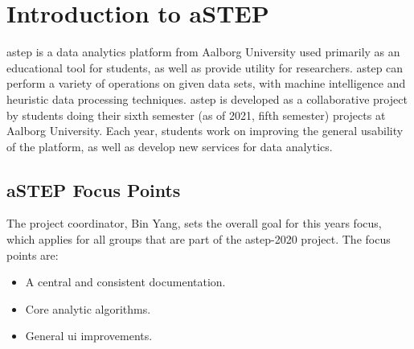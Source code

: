 \section{Introduction to aSTEP}
\gls{astep} is a data analytics platform from Aalborg University used primarily as an educational tool for students, as well as provide utility for researchers. \gls{astep} can perform a variety of operations on given data sets, with machine intelligence and heuristic data processing techniques. \gls{astep} is developed as a collaborative project by students doing their sixth semester (as of 2021, fifth semester) projects at Aalborg University. Each year, students work on improving the general usability of the platform, as well as develop new services for data analytics.

\subsection{aSTEP Focus Points}
The project coordinator, Bin Yang, sets the overall goal for this years focus, which applies for all groups that are part of the \gls{astep}-2020 project. The focus points are:
\begin{itemize}
    \item A central and consistent documentation.
    \item Core analytic algorithms.
    \item General \gls{ui} improvements.
\end{itemize}